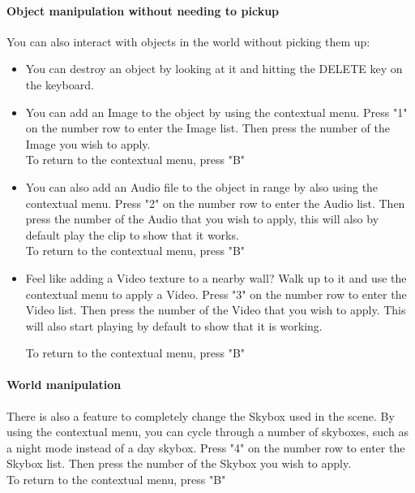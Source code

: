\documentclass{article}
\begin{document}
			\paragraph{Object manipulation without needing to pickup}

			You can also interact with objects in the world without picking them up:

			\begin{itemize}

				\item You can destroy an object by looking at it and hitting the DELETE key on the keyboard.

				\item You can add an Image to the object by using the contextual menu. Press "1" on the number row to enter the Image list. Then press the number of the Image you wish to apply.\\
				To return to the contextual menu, press "B"

				\item You can also add an Audio file to the object in range by also using the contextual menu. Press "2" on the number row to enter the Audio list. Then press the number of the Audio that you wish to apply, this will also by default play the clip to show that it works.\\
				
				To return to the contextual menu, press "B"

				\item Feel like adding a Video texture to a nearby wall? Walk up to it and use the contextual menu to apply a Video. Press "3" on the number row to enter the Video list. Then press the number of the Video that you wish to apply. This will also start playing by default to show that it is working.
				
				To return to the contextual menu, press "B"

			\end{itemize}

			\paragraph{World manipulation}

			There is also a feature to completely change the Skybox used in the scene.
			By using the contextual menu, you can cycle through a number of skyboxes, such as a night mode instead of a day skybox.
			Press "4" on the number row to enter the Skybox list. Then press the number of the Skybox you wish to apply.\\
			To return to the contextual menu, press "B"
\end{document}
